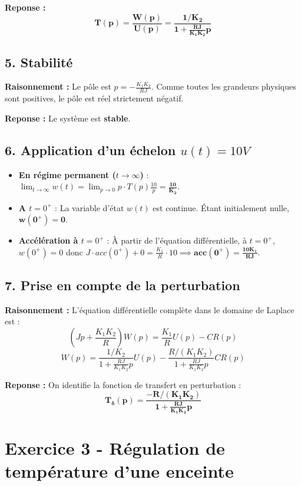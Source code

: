 \documentclass[11pt,a4paper]{article}
\begin{document}
\textbf{Reponse :}
$$
\mathbf{T(p) = \frac{W(p)}{U(p)} = \frac{1/K_2}{1 + \frac{RJ}{K_1 K_2}p}}
$$

\subsection*{5. Stabilité}

\textbf{Raisonnement :} Le pôle est $p = -\frac{K_1 K_2}{R J}$. Comme toutes les grandeurs physiques sont positives, le pôle est réel strictement négatif.

\textbf{Reponse :} Le système est \textbf{stable}.

\subsection*{6. Application d'un échelon $u(t)=10V$}

\begin{itemize}
    \item \textbf{En régime permanent ($t \to \infty$)} : $\lim_{t \to \infty} w(t) = \lim_{p \to 0} p \cdot T(p) \frac{10}{p} = \mathbf{\frac{10}{K_2}}$.
    \item \textbf{A $t=0^+$} : La variable d'état $w(t)$ est continue. Étant initialement nulle, $\mathbf{w(0^+) = 0}$.
    \item \textbf{Accélération à $t=0^+$} : À partir de l'équation différentielle, à $t=0^+$, $w(0^+)=0$ donc $J \cdot acc(0^+) + 0 = \frac{K_1}{R} \cdot 10 \implies \mathbf{acc(0^+) = \frac{10 K_1}{R J}}$.
\end{itemize}

\subsection*{7. Prise en compte de la perturbation}

\textbf{Raisonnement :} L'équation différentielle complète dans le domaine de Laplace est :
$$
(J p + \frac{K_1 K_2}{R}) W(p) = \frac{K_1}{R} U(p) - CR(p)
$$
$$
W(p) = \frac{1/K_2}{1 + \frac{R J}{K_1 K_2} p} U(p) - \frac{R/(K_1 K_2)}{1 + \frac{R J}{K_1 K_2} p} CR(p)
$$

\textbf{Reponse :} On identifie la fonction de transfert en perturbation :
$$
\mathbf{T_\delta(p) = \frac{-R/(K_1 K_2)}{1 + \frac{R J}{K_1 K_2} p}}
$$

\hrulefill

\section*{Exercice 3 - Régulation de température d'une enceinte}
\end{document}

